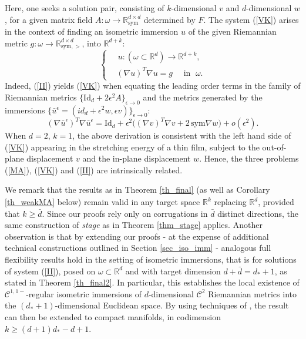 \documentclass[reqno,twoside,11pt]{amsart}
\newcommand{\sym}{\mathrm{sym}}
\newcommand{\Id}{\mathrm{Id}}
\newcommand{\R}{\mathbb{R}}
\numberwithin{equation}{section}
\theoremstyle{plain}
\theoremstyle{definition}
\begin{document}
Here, one seeks a solution pair, consisting of
$k$-dimensional $v$ and $d$-dimensional $w$, for a given matrix field
$A:\omega\to\R^{d\times d}_\sym$ determined by $F$. 
The system (\ref{VK}) arises 
in the context of finding an isometric immersion $u$ of the given Riemannian metric
$g:\omega\to\R^{d\times d}_{\sym, >}$, into $\R^{d+k}$:
\begin{equation}\label{II}
\left\{\begin{split}
& \, u:(\omega\subset\R^d)\to \R^{d+k},
\\ & (\nabla u)^T\nabla u = g\quad\mbox{ in }\;\omega.
\end{split}\right.
\end{equation}
Indeed, (\ref{II}) yields (\ref{VK}) when equating the leading order terms in
the family of Riemannian metrics $\{\Id_d+2\epsilon^2 A\}_{\epsilon\to 0}$
and the metrics generated by the immersions $\{\bar u^\epsilon =
({id}_d+\epsilon^2w, \epsilon v)\}_{\epsilon\to 0}$:
$$(\nabla \bar u^\epsilon)^T\nabla \bar u^\epsilon = \mbox{Id}_d +
\epsilon^2 \big((\nabla v)^T\nabla v + 2\, \sym\nabla w\big) + o(\epsilon^2).$$
When $d=2$, $k=1$, the above derivation is consistent with 
the left hand side of (\ref{VK}) appearing in the stretching energy of
a thin film, subject to the out-of-plane displacement $v$ and the in-plane displacement $w$.  
Hence, the three problems (\ref{MA}), (\ref{VK}) and
(\ref{II}) are intrinsically related.

\bigskip

\noindent We remark that the results as in Theorem \ref{th_final} (as
well as Corollary \ref{th_weakMA} below) remain valid in any target space $\mathbb{R}^k$ replacing $\R^{\bar d}$, provided that $k \geq\bar d$. Since our proofs rely only on corrugations in $\bar d$ distinct directions, the same
construction of {\em stage} as in Theorem \ref{thm_stage} applies.
Another observation is that by extending our proofs - at the expense of additional technical constructions outlined in Section \ref{sec_iso_imm} - analogous full flexibility results hold in the setting of isometric immersions, that is for solutions of system (\ref{II}), posed on $\omega \subset \mathbb{R}^d$ and with target dimension $d + \bar d = d_* + 1$, as stated in Theorem \ref{th_final2}. In particular, this establishes the local existence of $\mathcal{C}^{1,1-}$-regular isometric immersions of $d$-dimensional $\mathcal{C}^2$ Riemannian metrics into the $(d_*+1)$-dimensional Euclidean space. By using techniques of \cite{CDS}, the result can then be extended to compact manifolds, in codimension $k\geq (d+1)d_*-d+1$.
\end{document}
